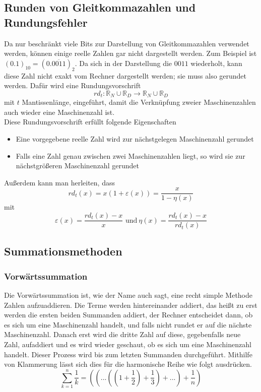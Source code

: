 \documentclass{scrartcl}
\begin{document}
\subsection{Runden von Gleitkommazahlen und Rundungsfehler}
Da nur beschränkt viele Bits zur Darstellung von Gleitkommazahlen verwendet
werden, können einige reelle Zahlen gar nicht dargestellt werden.
Zum Beispiel ist \\ \((0.1)_{10} = (0.
\overline{0011})_2 \).
Da sich in der Darstellung die \(0011\) wiederholt, kann diese Zahl nicht exakt
vom Rechner dargestellt werden; sie muss also gerundet werden.
Dafür wird eine Rundungsvorschrift \[rd_t: \mathbb{R}_N \cup \mathbb{R}_D
    \rightarrow \mathbb{R}_N \cup \mathbb{R}_D\] mit \(t\) Mantissenlänge,
eingeführt, damit die Verknüpfung zweier Maschinenzahlen auch wieder eine
Maschinenzahl ist.
\\
Diese Rundungsvorschrift erfüllt folgende Eigenschaften
\begin{itemize}
    \item Eine vorgegebene reelle Zahl wird zur nächstgelegen Maschinenzahl gerundet
    \item Falls eine Zahl genau zwischen zwei Maschinenzahlen liegt, so wird sie zur nächstgrößeren Maschinenzahl gerundet
\end{itemize}
Außerdem kann man herleiten, dass \[rd_t(x) = x(1+\varepsilon(x)) =
    \frac{x}{1-\eta(x)}\] mit \[\varepsilon(x) = \frac{rd_t(x) - x}{x} \text{ und}\
    \eta(x) = \frac{rd_t(x) - x}{rd_t(x)} \]

\subsection{Summationsmethoden} \subsubsection{Vorwärtssummation} Die
Vorwärtssummation ist, wie der Name auch sagt, eine recht simple Methode Zahlen
aufzuaddieren.
Die Terme werden hintereinander addiert, das heißt zu erst werden die ersten
beiden Summanden addiert, der Rechner entscheidet dann, ob es sich um eine
Maschinenzahl handelt, und falls nicht rundet er auf die nächste Maschinenzahl.
Danach erst wird die dritte Zahl auf diese, gegebenfalls neue Zahl, aufaddiert
und es wird wieder geschaut, ob es sich um eine Maschinenzahl handelt.
Dieser Prozess wird bis zum letzten Summanden durchgeführt.
Mithilfe von Klammerung lässt sich dies für die harmonische Reihe wie folgt
ausdrücken.
\[ \sum_{k=1}^{n} \frac{1}{k} = ((...((1+\frac{1}{2})+\frac{1}{3})+ ...) + \frac{1}{n}) \]
\end{document}
